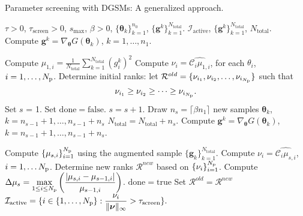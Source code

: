\begin{breakablealgorithm}
\renewcommand{\algorithmicrequire}{\textbf{Input:}}
\renewcommand{\algorithmicensure}{\textbf{Output:}}
  \caption{Parameter screening with DGSMs: A generalized approach.}
  \begin{algorithmic}[1]
\Require $\tau > 0$, $\tau_\text{screen} > 0$,
$s_\text{max}$, $\beta > 0$, $\{ \bm{\theta}_k \}_{k = 1}^{n_0}$, $\{ \bm{g}^k \}_{k=1}^{N_\text{total}}$. 
\Ensure $\mathcal{I}_\text{active}$, $\{ \bm{g}^k \}_{k=1}^{N_\text{total}}$, $N_\text{total}$. 
      \State Compute $\bm{g}^k = \nabla_{\bm{\theta}}G(\bm\theta_k)$, 
             $k = 1, \ldots, n_1$. 

      \State Compute 
      $\mu_{1, i} = \frac{1}{N_\text{total}} \sum_{k = 1}^{N_\text{total}} (g^k_i)^2$
      \State Compute $\nu_i = \widehat{\mathcal{C}_i\mu_{1,i}}$, for each $\theta_i$, 
             $i = 1, \ldots, {N_\text{p}}$. 
      \State Determine initial ranks: 
            let $\mathcal{R}^{old} = \{ \nu_{i_1}, \nu_{i_2}, \ldots, \nu_{i_{N_\text{p}}}\}$ such that 
\[
   \nu_{i_1} \geq \nu_{i_2} \geq \cdots \geq \nu_{i_{N_\text{p}}}. 
\]
      \State Set $s$ = 1.
      \State Set $\mathrm{done} = \mathrm{false}$.
        \State $s = s + 1$.
        \State Draw $n_s = \lceil \beta n_1 \rceil$ new samples 
                  $\bm{\theta}_k$, $k = n_{s-1} + 1, \ldots, n_{s-1} + n_s$
       \State $N_\text{total} = N_\text{total} + n_s$.
        \State Compute $\bm{g}^k = \nabla_{\bm{\theta}}G(\bm\theta_k)$,
             $k = n_{s-1}+1, \ldots, n_{s-1}+n_s$.

        \State Compute $\{ \mu_{s,i} \}_{i=1}^{N_\text{p}}$ using the augmented sample 
               $\{\bm{g}_k \}_{k = 1}^{N_\text{total}}$.
        \State Compute $\nu_i = \widehat{\mathcal{C}_i\mu_{s,i}}$, $i = 1, \ldots {N_\text{p}}$.
        \State Determine new ranks $\mathcal{R}^{new}$ based on $\{\nu_i\}_{i=1}^{N_\text{p}}$. 
        \State Compute $\displaystyle\Delta\mu_s = \max_{1\leq i \leq {N_\text{p}}}
               \left(\frac{|\mu_{s,i} - \mu_{s-1,i}|}{ \mu_{s-1,i}}\right)$.
         \State $\mathrm{done} = \mathrm{true}$
      \Else
          \State Set $\mathcal{R}^{old} = \mathcal{R}^{new}$
      \EndIf
    \EndWhile
    \State $\mathcal{I}_\text{active} = \{ i \in \{1, \ldots, {N_\text{p}}\} : \displaystyle\frac{\nu_i}
        {\|\bm{\nu}\|_\infty} > \tau_\text{screen}\}.$
    
    \EndProcedure
  \end{algorithmic}
  \label{alg:screen}
\end{breakablealgorithm}

